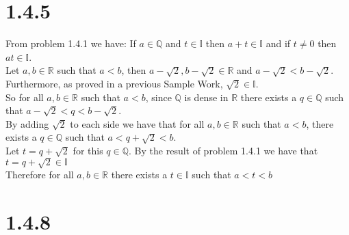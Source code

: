 \documentclass{article}
\begin{document}
\section*{1.4.5}
\begin{center}
    \doublespacing
    From problem 1.4.1 we have: If $a\in\mathbb{Q}$ and $t\in\mathbb{I}$ then $a + t\in\mathbb{I}$ and if $t\neq 0$ then $at\in\mathbb{I}$.
    \\Let $a, b\in\mathbb{R}$ such that $a < b$, then $a - \sqrt{2}, b - \sqrt{2}\in\mathbb{R}$ and $a - \sqrt{2} < b - \sqrt{2}$.
    \\Furthermore, as proved in a previous Sample Work, $\sqrt{2}\in\mathbb{I}$.
    \\So for all $a, b\in\mathbb{R}$ such that $a < b$, since $\mathbb{Q}$ is dense in $\mathbb{R}$ there exists a $q\in\mathbb{Q}$ such that $a - \sqrt{2} < q < b - \sqrt{2}$.
    \\By adding $\sqrt{2}$ to each side we have that for all $a, b\in\mathbb{R}$ such that $a < b$, there exists a $q\in\mathbb{Q}$ such that $a < q + \sqrt{2} < b$.
    \\Let $t = q + \sqrt{2}$ for this $q\in\mathbb{Q}$. By the result of problem 1.4.1 we have that $t = q + \sqrt{2}\in\mathbb{I}$
    \\Therefore for all $a, b\in\mathbb{R}$ there exists a $t\in\mathbb{I}$ such that $a < t < b$ \qedsymbol
\end{center}


\section*{1.4.8}
\end{document}
